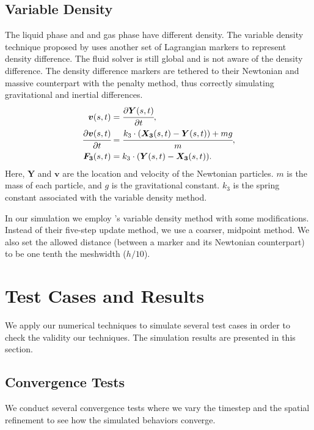 \documentclass{jfm}
\begin{document}
\subsection{Variable Density}
The liquid phase and and gas phase have different density. The variable density technique proposed by \cite{IBM_variable_density} uses another set of Lagrangian markers to represent density difference. The fluid solver is still global and is not aware of the density difference. The density difference markers are tethered to their Newtonian and massive counterpart with the penalty method, thus correctly simulating gravitational and inertial differences.
\begin{align}
\bm{v}(s,t) & = \cfrac{\partial \bm{Y}(s,t)}{\partial t}, \\
\cfrac{\partial \bm{v}(s,t)}{\partial t} & = \cfrac
    {k_3 \cdot (
        \bm{X_3}(s,t) - \bm{Y}(s,t)
    ) + m g}
    {m}, \\
\bm{F_3}(s,t) & = k_3 \cdot (
    \bm{Y}(s,t) - \bm{X_3}(s,t)
). \label{eq:variable-density}
\end{align}
Here, $\boldsymbol{Y}$ and $\boldsymbol{v}$ are the location and velocity of the Newtonian particles. $m$ is the mass of each particle, and $g$ is the gravitational constant. $k_3$ is the spring constant associated with the variable density method. 

In our simulation we employ \cite{IBM_variable_density}'s variable density method with some modifications. Instead of their five-step update method, we use a coarser, midpoint method. We also set the allowed distance (between a marker and its Newtonian counterpart) to be one tenth the meshwidth ($h/10$). 


\section {Test Cases and Results}
We apply our numerical techniques to simulate several test cases in order to check the validity our techniques. The simulation results are presented in this section. 
\subsection {Convergence Tests}
    We conduct several convergence tests where we vary the timestep and the spatial refinement to see how the simulated behaviors converge. 
\end{document}
